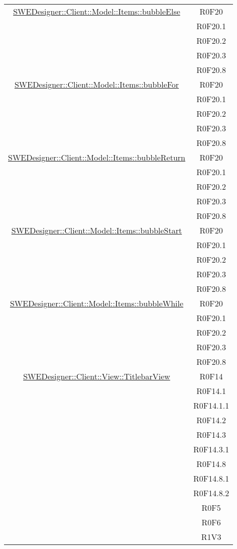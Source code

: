 \documentclass[../DefinizioneDiProdotto.tex]{subfiles}
\begin{document}
\begin{longtable}{|c|c|}
				\hyperlink{SWEDesigner::Client::Model::Items::bubbleElse}{SWEDesigner::Client::Model::Items::bubbleElse}
				& R0F20\\
				& R0F20.1\\
				& R0F20.2\\
				& R0F20.3\\
				& R0F20.8\\
				\hline

				\hyperlink{SWEDesigner::Client::Model::Items::bubbleFor}{SWEDesigner::Client::Model::Items::bubbleFor}
				& R0F20\\
				& R0F20.1\\
				& R0F20.2\\
				& R0F20.3\\
				& R0F20.8\\
				\hline

				\hyperlink{SWEDesigner::Client::Model::Items::bubbleReturn}{SWEDesigner::Client::Model::Items::bubbleReturn}
				& R0F20\\
				& R0F20.1\\
				& R0F20.2\\
				& R0F20.3\\
				& R0F20.8\\
				\hline

				\hyperlink{SWEDesigner::Client::Model::Items::bubbleStart}{SWEDesigner::Client::Model::Items::bubbleStart}
				& R0F20\\
				& R0F20.1\\
				& R0F20.2\\
				& R0F20.3\\
				& R0F20.8\\
				\hline

				\hyperlink{SWEDesigner::Client::Model::Items::bubbleWhile}{SWEDesigner::Client::Model::Items::bubbleWhile}
				& R0F20\\
				& R0F20.1\\
				& R0F20.2\\
				& R0F20.3\\
				& R0F20.8\\
				\hline


				\hyperlink{SWEDesigner::Client::View::TitlebarView}{SWEDesigner::Client::View::TitlebarView}
				& R0F14\\
				& R0F14.1\\
				& R0F14.1.1\\
				& R0F14.2\\
				& R0F14.3\\
				& R0F14.3.1\\
				& R0F14.8\\
				& R0F14.8.1\\
				& R0F14.8.2\\
				& R0F5\\
				& R0F6\\
				& R1V3\\
				\hline


\end{longtable}
\end{document}

